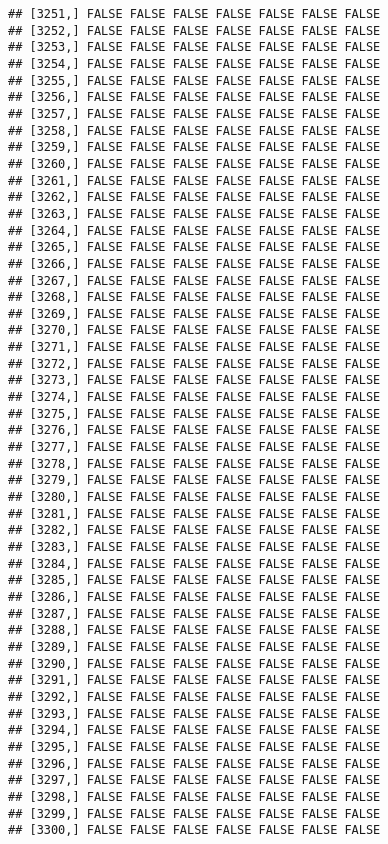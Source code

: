 \documentclass[
]{article}
\begin{document}
\begin{verbatim}
## [3251,] FALSE FALSE FALSE FALSE FALSE FALSE FALSE
## [3252,] FALSE FALSE FALSE FALSE FALSE FALSE FALSE
## [3253,] FALSE FALSE FALSE FALSE FALSE FALSE FALSE
## [3254,] FALSE FALSE FALSE FALSE FALSE FALSE FALSE
## [3255,] FALSE FALSE FALSE FALSE FALSE FALSE FALSE
## [3256,] FALSE FALSE FALSE FALSE FALSE FALSE FALSE
## [3257,] FALSE FALSE FALSE FALSE FALSE FALSE FALSE
## [3258,] FALSE FALSE FALSE FALSE FALSE FALSE FALSE
## [3259,] FALSE FALSE FALSE FALSE FALSE FALSE FALSE
## [3260,] FALSE FALSE FALSE FALSE FALSE FALSE FALSE
## [3261,] FALSE FALSE FALSE FALSE FALSE FALSE FALSE
## [3262,] FALSE FALSE FALSE FALSE FALSE FALSE FALSE
## [3263,] FALSE FALSE FALSE FALSE FALSE FALSE FALSE
## [3264,] FALSE FALSE FALSE FALSE FALSE FALSE FALSE
## [3265,] FALSE FALSE FALSE FALSE FALSE FALSE FALSE
## [3266,] FALSE FALSE FALSE FALSE FALSE FALSE FALSE
## [3267,] FALSE FALSE FALSE FALSE FALSE FALSE FALSE
## [3268,] FALSE FALSE FALSE FALSE FALSE FALSE FALSE
## [3269,] FALSE FALSE FALSE FALSE FALSE FALSE FALSE
## [3270,] FALSE FALSE FALSE FALSE FALSE FALSE FALSE
## [3271,] FALSE FALSE FALSE FALSE FALSE FALSE FALSE
## [3272,] FALSE FALSE FALSE FALSE FALSE FALSE FALSE
## [3273,] FALSE FALSE FALSE FALSE FALSE FALSE FALSE
## [3274,] FALSE FALSE FALSE FALSE FALSE FALSE FALSE
## [3275,] FALSE FALSE FALSE FALSE FALSE FALSE FALSE
## [3276,] FALSE FALSE FALSE FALSE FALSE FALSE FALSE
## [3277,] FALSE FALSE FALSE FALSE FALSE FALSE FALSE
## [3278,] FALSE FALSE FALSE FALSE FALSE FALSE FALSE
## [3279,] FALSE FALSE FALSE FALSE FALSE FALSE FALSE
## [3280,] FALSE FALSE FALSE FALSE FALSE FALSE FALSE
## [3281,] FALSE FALSE FALSE FALSE FALSE FALSE FALSE
## [3282,] FALSE FALSE FALSE FALSE FALSE FALSE FALSE
## [3283,] FALSE FALSE FALSE FALSE FALSE FALSE FALSE
## [3284,] FALSE FALSE FALSE FALSE FALSE FALSE FALSE
## [3285,] FALSE FALSE FALSE FALSE FALSE FALSE FALSE
## [3286,] FALSE FALSE FALSE FALSE FALSE FALSE FALSE
## [3287,] FALSE FALSE FALSE FALSE FALSE FALSE FALSE
## [3288,] FALSE FALSE FALSE FALSE FALSE FALSE FALSE
## [3289,] FALSE FALSE FALSE FALSE FALSE FALSE FALSE
## [3290,] FALSE FALSE FALSE FALSE FALSE FALSE FALSE
## [3291,] FALSE FALSE FALSE FALSE FALSE FALSE FALSE
## [3292,] FALSE FALSE FALSE FALSE FALSE FALSE FALSE
## [3293,] FALSE FALSE FALSE FALSE FALSE FALSE FALSE
## [3294,] FALSE FALSE FALSE FALSE FALSE FALSE FALSE
## [3295,] FALSE FALSE FALSE FALSE FALSE FALSE FALSE
## [3296,] FALSE FALSE FALSE FALSE FALSE FALSE FALSE
## [3297,] FALSE FALSE FALSE FALSE FALSE FALSE FALSE
## [3298,] FALSE FALSE FALSE FALSE FALSE FALSE FALSE
## [3299,] FALSE FALSE FALSE FALSE FALSE FALSE FALSE
## [3300,] FALSE FALSE FALSE FALSE FALSE FALSE FALSE

\end{verbatim}
\end{document}
